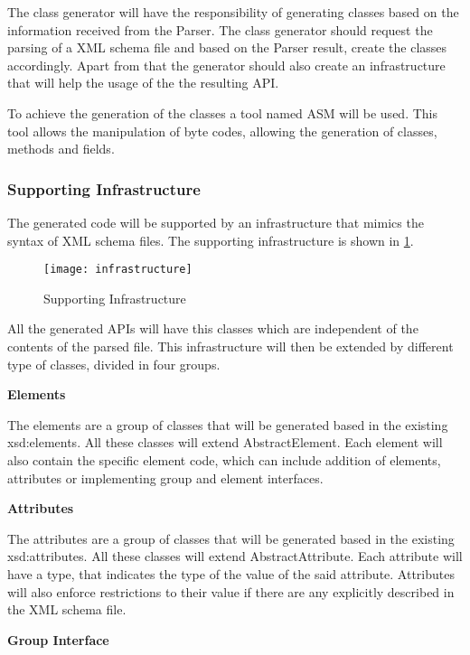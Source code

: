 The class generator will have the responsibility of generating classes based on the information received from the Parser. The class generator should request the parsing of a XML schema file and based on the Parser result, create the classes accordingly. Apart from that the generator should also create an infrastructure that will help the usage of the the resulting API. 

\noindent
To achieve the generation of the classes a tool named ASM will be used. This tool allows the manipulation of byte codes, allowing the generation of classes, methods and fields. 

\newpage

\subsubsection{Supporting Infrastructure}

The generated code will be supported by an infrastructure that mimics the syntax of XML schema files. The supporting infrastructure is shown in \ref{Infrastructure}.

\begin{figure}[h]
	\centering
	\texttt{[image: infrastructure]}
	\caption{Supporting Infrastructure}
	\label{Infrastructure}
\end{figure}

\noindent
All the generated APIs will have this classes which are independent of the contents of the parsed file. This infrastructure will then be extended by different type of classes, divided in four groups.

\textbf{Elements}

The elements are a group of classes that will be generated based in the existing xsd:elements. All these classes will extend AbstractElement. Each element will also contain the specific element code, which can include addition of elements, attributes or implementing group and element interfaces.

\textbf{Attributes}

The attributes are a group of classes that will be generated based in the existing xsd:attributes. All these classes will extend AbstractAttribute. Each attribute will have a type, that indicates the type of the value of the said attribute. Attributes will also enforce restrictions to their value if there are any explicitly described in the XML schema file.

\textbf{Group Interface}


